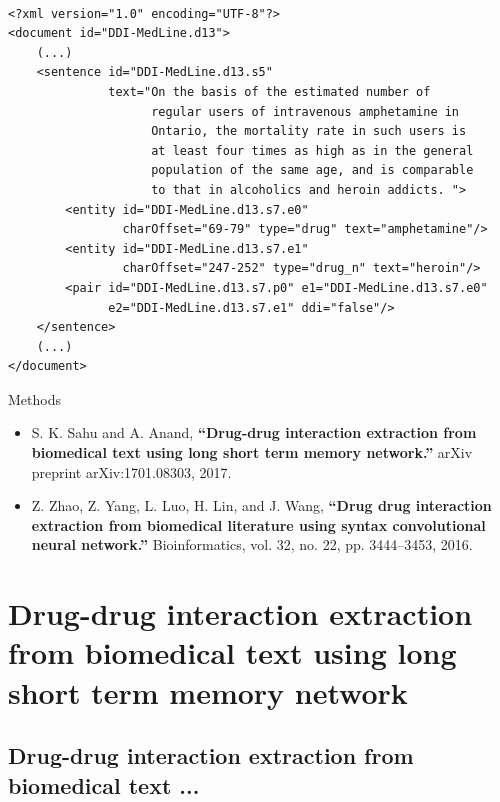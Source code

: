 \documentclass[xcolor={dvipsnames}]{beamer}
\begin{document}
\begin{frame}[fragile]{\insertsection}
\begin{verbatim}

<?xml version="1.0" encoding="UTF-8"?>
<document id="DDI-MedLine.d13">
    (...)
    <sentence id="DDI-MedLine.d13.s5" 
              text="On the basis of the estimated number of
                    regular users of intravenous amphetamine in
                    Ontario, the mortality rate in such users is 
                    at least four times as high as in the general 
                    population of the same age, and is comparable 
                    to that in alcoholics and heroin addicts. ">
        <entity id="DDI-MedLine.d13.s7.e0"
                charOffset="69-79" type="drug" text="amphetamine"/>
        <entity id="DDI-MedLine.d13.s7.e1"
                charOffset="247-252" type="drug_n" text="heroin"/>
        <pair id="DDI-MedLine.d13.s7.p0" e1="DDI-MedLine.d13.s7.e0"
              e2="DDI-MedLine.d13.s7.e1" ddi="false"/>
    </sentence>
    (...)
</document>
\end{verbatim}

\end{frame}

\begin{frame}[fragile]{\insertsection}

\begin{alertblock}{Methods}

\begin{itemize}
\item S. K. Sahu and A. Anand, \textbf{“Drug-drug interaction extraction from biomedical text using long short term memory network.”} arXiv preprint arXiv:1701.08303, 2017.
\item Z. Zhao, Z. Yang, L. Luo, H. Lin, and J. Wang, \textbf{“Drug drug interaction extraction from biomedical literature using syntax convolutional neural network.”} Bioinformatics, vol. 32, no. 22, pp. 3444–3453, 2016.
\end{itemize}
\end{alertblock}
\end{frame}

\section{Drug-drug interaction extraction from biomedical text using long short term memory network}
\subsection{Drug-drug interaction extraction from biomedical text ...}
\end{document}
